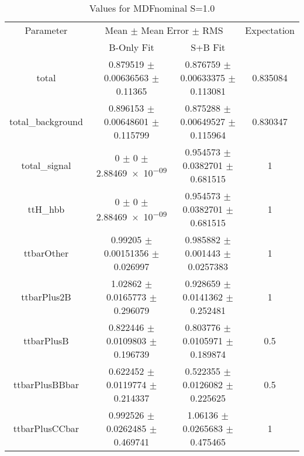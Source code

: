 \begin{table}
\centering
\caption{Values for MDFnominal S=1.0}
\begin{tabular}{cccc}
\toprule
Parameter & \multicolumn{2}{c}{Mean $\pm$ Mean Error $\pm$ RMS} & Expectation\\
 & B-Only Fit & S+B Fit & \\
\midrule
total & \num{0.879519} $\pm$ \num{0.00636563} $\pm$ \num{0.11365} & \num{0.876759} $\pm$ \num{0.00633375} $\pm$ \num{0.113081} & \num{0.835084}\\
total\_background & \num{0.896153} $\pm$ \num{0.00648601} $\pm$ \num{0.115799} & \num{0.875288} $\pm$ \num{0.00649527} $\pm$ \num{0.115964} & \num{0.830347}\\
total\_signal & \num{0} $\pm$ \num{0} $\pm$ \num{2.88469e-09} & \num{0.954573} $\pm$ \num{0.0382701} $\pm$ \num{0.681515} & \num{1}\\
ttH\_hbb & \num{0} $\pm$ \num{0} $\pm$ \num{2.88469e-09} & \num{0.954573} $\pm$ \num{0.0382701} $\pm$ \num{0.681515} & \num{1}\\
ttbarOther & \num{0.99205} $\pm$ \num{0.00151356} $\pm$ \num{0.026997} & \num{0.985882} $\pm$ \num{0.001443} $\pm$ \num{0.0257383} & \num{1}\\
ttbarPlus2B & \num{1.02862} $\pm$ \num{0.0165773} $\pm$ \num{0.296079} & \num{0.928659} $\pm$ \num{0.0141362} $\pm$ \num{0.252481} & \num{1}\\
ttbarPlusB & \num{0.822446} $\pm$ \num{0.0109803} $\pm$ \num{0.196739} & \num{0.803776} $\pm$ \num{0.0105971} $\pm$ \num{0.189874} & \num{0.5}\\
ttbarPlusBBbar & \num{0.622452} $\pm$ \num{0.0119774} $\pm$ \num{0.214337} & \num{0.522355} $\pm$ \num{0.0126082} $\pm$ \num{0.225625} & \num{0.5}\\
ttbarPlusCCbar & \num{0.992526} $\pm$ \num{0.0262485} $\pm$ \num{0.469741} & \num{1.06136} $\pm$ \num{0.0265683} $\pm$ \num{0.475465} & \num{1}\\
\bottomrule
\end{tabular}
\end{table}